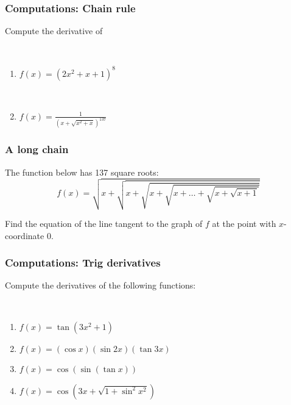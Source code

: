 \documentclass[14pt]{beamer}
\newcommand {\DS} [1] {${\displaystyle #1}$}
\begin{document}
\begin{frame}[t]
\frametitle{Computations: Chain rule}

Compute the derivative of 

\

\begin{enumerate}
	\item  \DS{f(x) = \left( 2x^2+x+1 \right)^{8} }


\
	
	\item \DS{f(x) = \frac{1}{\left( x + \sqrt{x^2+x}  \right)^{137}}  }

\end{enumerate}

\end{frame}
\begin{frame}[t]
\frametitle{A long chain}

The function below has 137 square roots:
	$$
		f(x) = \sqrt{x+ \sqrt{x + \sqrt{x + \sqrt{x+ \ldots + \sqrt{x + \sqrt{x+1}}}}}}
	$$

Find the equation of the line tangent to the graph of $f$ at the point with $x$-coordinate $0$.
\end{frame}


\begin{frame}[t]
\frametitle{Computations: Trig derivatives}


Compute the derivatives of the following functions:

\
\begin{enumerate}
	\item  \DS{f(x) = \tan (3x^2+1)}

\vfill
	\item  \DS{f(x) = (\cos x )( \sin 2x )(\tan 3x)}

\vfill
	\item  \DS{f(x) = \cos ( \sin( \tan x))}
\vfill
	\item  \DS{f(x) = \cos \left( 3x + \sqrt{1 + \sin^2 x^2 } \right)}
\vfill
\end{enumerate}


\end{frame}

\end{document}
